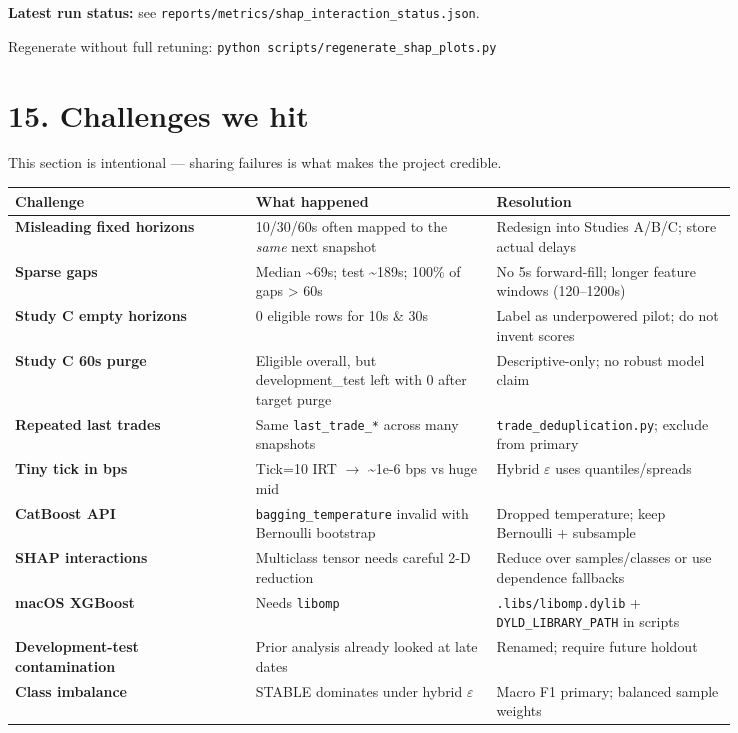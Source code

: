 \documentclass[11pt,a4paper]{article}
\begin{document}
\textbf{Latest run status:} see \texttt{reports/metrics/shap\_interaction\_status.json}.


Regenerate without full retuning: \texttt{python scripts/regenerate\_shap\_plots.py}


\vspace{0.5em}

\section{15. Challenges we hit}

This section is intentional --- sharing failures is what makes the project credible.


\begin{center}
\begin{tabular}{L{0.28\linewidth}L{0.28\linewidth}L{0.28\linewidth}}
\toprule
Challenge & What happened & Resolution \\
\midrule
\textbf{Misleading fixed horizons} & 10/30/60s often mapped to the \textit{same} next snapshot & Redesign into Studies A/B/C; store actual delays \\
\textbf{Sparse gaps} & Median \textasciitilde{}69s; test \textasciitilde{}189s; 100\% of gaps > 60s & No 5s forward-fill; longer feature windows (120--1200s) \\
\textbf{Study C empty horizons} & 0 eligible rows for 10s \& 30s & Label as underpowered pilot; do not invent scores \\
\textbf{Study C 60s purge} & Eligible overall, but development\_test left with 0 after target purge & Descriptive-only; no robust model claim \\
\textbf{Repeated last trades} & Same \texttt{last\_trade\_*} across many snapshots & \texttt{trade\_deduplication.py}; exclude from primary \\
\textbf{Tiny tick in bps} & Tick=10 IRT $\rightarrow$ \textasciitilde{}1e-6 bps vs huge mid & Hybrid $\varepsilon$ uses quantiles/spreads \\
\textbf{CatBoost API} & \texttt{bagging\_temperature} invalid with Bernoulli bootstrap & Dropped temperature; keep Bernoulli + subsample \\
\textbf{SHAP interactions} & Multiclass tensor needs careful 2-D reduction & Reduce over samples/classes or use dependence fallbacks \\
\textbf{macOS XGBoost} & Needs \texttt{libomp} & \texttt{.libs/libomp.dylib} + \texttt{DYLD\_LIBRARY\_PATH} in scripts \\
\textbf{Development-test contamination} & Prior analysis already looked at late dates & Renamed; require future holdout \\
\textbf{Class imbalance} & STABLE dominates under hybrid $\varepsilon$ & Macro F1 primary; balanced sample weights \\
\bottomrule
\end{tabular}
\end{center}
\vspace{0.35em}
\end{document}
